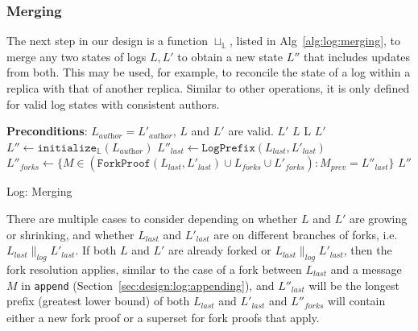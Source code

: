 \documentclass[9pt, oneside]{article}   	%
\begin{document}
\subsubsection{Merging}
\label{sec:design:log:merging}

The next step in our design is a function $\sqcup_\mathds{L}$, listed in Alg~\ref{alg:log:merging}, to merge any two states of logs $L,L'$ to obtain a new state $L''$ that includes updates from both. This may be used, for example, to reconcile the state of a log within a replica with that of another replica.  Similar to other operations, it is only defined for valid log states with consistent authors. 

\begin{algorithm}[h]
\begin{algorithmic}[1]
	\State \textbf{Preconditions}:  $L_\textit{author} = L'_\textit{author}$, $L$ and $L'$ are valid.
	\State
		 
				 \State \Return $L'$
			\Else
				 \State \Return $L$
			\EndIf
			 \State \Return L 
			 \State \Return $L'$ 
		\EndIf
	\EndIf
	\State
	\State $L'' \leftarrow \texttt{initialize}_\mathds{L}(L_\textit{author})$
	\State $L''_\textit{last} \leftarrow \texttt{LogPrefix}(L_\textit{last},L'_\textit{last})$
	\State $L''_\textit{forks} \leftarrow \{ M \in (\texttt{ForkProof}(L_\textit{last},L'_\textit{last}) \cup L_\textit{forks} \cup L'_\textit{forks}) : M_\textit{prev} = L''_\textit{last} \}$
	\State \Return $L''$	
\EndFunction
\end{algorithmic}
\caption{\label{alg:log:merging} Log: Merging}
\end{algorithm}

There are multiple cases to consider depending on whether $L$ and $L'$ are growing or shrinking, and whether $L_\textit{last}$ and $L'_\textit{last}$ are on different branches of forks, i.e. $L_\textit{last} \parallel_\textit{log} L'_\textit{last}$.  If both $L$ and $L'$ are already forked or  $L_\textit{last} \parallel_\textit{log} L'_\textit{last}$, then the fork resolution applies, similar to the case of a fork between $L_\textit{last}$ and a message $M$ in \texttt{append} (Section~\ref{sec:design:log:appending}), and $L''_\textit{last}$ will be the longest prefix (greatest lower bound) of both $L_\textit{last}$ and $L'_\textit{last}$ and $L''_\textit{forks}$ will contain either a new fork proof or a superset for fork proofs that apply. 
\end{document}
